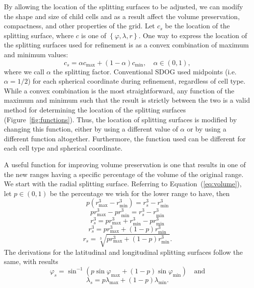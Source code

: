By allowing the location of the splitting surfaces to be adjusted, we can modify the shape and size of child cells and as a result affect the volume preservation, compactness, and other properties of the grid.
Let $c_{s}$ be the location of the splitting surface, where $c$ is one of $\left\lbrace \varphi, \lambda, r \right\rbrace$.
One way to express the location of the splitting surfaces used for refinement is as a convex combination of maximum and minimum values:
%
\begin{equation*}
c_{s} = \alpha c_\mathrm{max} + \left( 1-\alpha \right) c_\mathrm{min}, \quad \alpha \in \left( 0, 1 \right),
\end{equation*}
%
where we call $\alpha$ the splitting factor.
Conventional SDOG used midpoints (i.e. $\alpha = 1/2$) for each spherical coordinate during refinement, regardless of cell type.
While a convex combination is the most straightforward, any function of the maximum and minimum such that the result is strictly between the two is a valid method for determining the location of the splitting surfaces (Figure~\ref{fig:functions}).
Thus, the location of splitting surfaces is modified by changing this function, either by using a different value of $\alpha$ or by using a different function altogether.
Furthermore, the function used can be different for each cell type and spherical coordinate.


A useful function for improving volume preservation is one that results in one of the new ranges having a specific percentage of the volume of the original range.
We start with the radial splitting surface.
Referring to Equation~(\ref{eq:volume}), let $p \in (0,1)$ be the percentage we wish for the lower range to have, then
%
\begin{equation*}
p \left( r_\mathrm{max}^{3} - r_\mathrm{min}^{3} \right) = r_{s}^{3} - r_\mathrm{min}^{3}
\end{equation*}
%
\begin{equation*}
p r_\mathrm{max}^{3} - p r_\mathrm{min}^{3} = r_{s}^{3} - r_\mathrm{min}^{3}
\end{equation*}
%
\begin{equation*}
r_{s}^{3} = p r_\mathrm{max}^{3} + r_\mathrm{min}^{3} - p r_\mathrm{min}^{3}
\end{equation*}
%
\begin{equation*}
r_{s}^{3} = p r_\mathrm{max}^{3} + \left( 1 - p \right) r_\mathrm{min}^{3}
\end{equation*}
%
\begin{equation} \label{eq:radVol}
r_{s} = \sqrt[3]{ p r_\mathrm{max}^{3} + \left( 1 - p \right) r_\mathrm{min}^{3} }.
\end{equation}
%
The derivations for the latitudinal and longitudinal splitting surfaces follow the same, with results
%
\begin{equation} \label{eq:latVol}
\varphi_{s} = \sin^{-1} \left( p \sin\varphi_\mathrm{max} + \left( 1 - p \right) \sin\varphi_\mathrm{min} \right) \quad\text{and}
\end{equation}
%
\begin{equation} \label{eq:longVol}
\lambda_{s} = p \lambda_\mathrm{max} + \left( 1 - p \right) \lambda_\mathrm{min}.
\end{equation}



